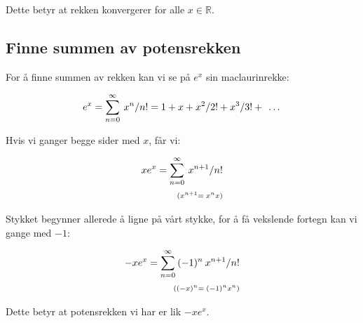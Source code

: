 \documentclass[12pt,a4paper]{article}
\def\frac#1#2{#1/#2}%
\begin{document}
Dette betyr at rekken konvergerer for alle $x \in \mathbb{R}$.


\subsection{Finne summen av potensrekken}
For å finne summen av rekken kan vi se på $e^x$ sin maclaurinrekke:

\begin{equation*}
  e^x = \sum_{n=0}^{\infty} \hspace{0.5ex} \frac{x^n}{n!} = 1 + x + \frac{x^2}{2!} + \frac{x^3}{3!} + \hspace{1ex}\dots
\end{equation*}


Hvis vi ganger begge sider med $x$, får vi:

\begin{equation*}
  \begin{split}
    xe^x = \sum_{n=0}^{\infty} \hspace{0.5ex} \frac{x^{n+1}}{n!} \\
    {\scriptstyle (x^{n+1} = \hspace{0.5ex} x^n x)}
  \end{split}
\end{equation*}


Stykket begynner allerede å ligne på vårt stykke, 
for å få vekslende fortegn kan vi gange med $-1$:

\begin{equation*}
  \begin{split}
  -xe^x = \sum_{n=0}^{\infty} \hspace{0.5ex} (-1)^n \hspace{0.5ex} \frac{x^{n+1}}{n!} \\
  {\scriptstyle ((-x)^n = \hspace{0.5ex} (-1)^n x^n)}
  \end{split}
\end{equation*}

Dette betyr at potensrekken vi har er lik $-xe^x$.
\end{document}
